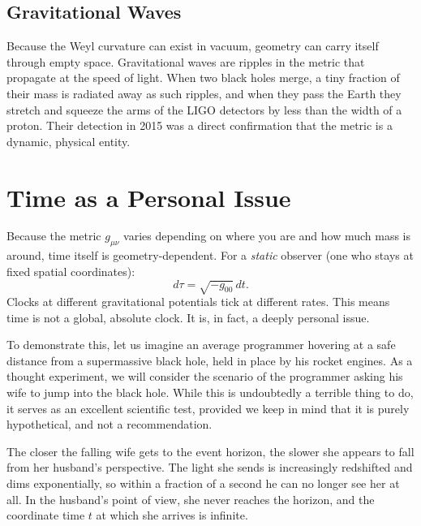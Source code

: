 \subsection*{Gravitational Waves}

Because the Weyl curvature can exist in vacuum, geometry can carry itself through empty space.
Gravitational waves are ripples in the metric that propagate at the speed of light.
When two black holes merge, a tiny fraction of their mass is radiated away as such ripples, and when they pass the Earth 
they stretch and squeeze the arms of the LIGO detectors by less than the width of a proton.
Their detection in 2015 was a direct confirmation that the metric is a dynamic, physical entity.


\section*{Time as a Personal Issue}

Because the metric $g_{\mu\nu}$ varies depending on where you are and how much mass is around, time itself is geometry-dependent.
For a \emph{static} observer (one who stays at fixed spatial coordinates):
\begin{equation}
d\tau = \sqrt{-g_{00}} \, dt.
\end{equation}
Clocks at different gravitational potentials tick at different rates.
This means time is not a global, absolute clock.
It is, in fact, a deeply personal issue.

To demonstrate this, let us imagine an average programmer hovering at a safe distance from a supermassive black hole, held in place by his rocket engines.
As a thought experiment, we will consider the scenario of the programmer asking his wife to jump into the black hole.
While this is undoubtedly a terrible thing to do, it serves as an excellent scientific test, provided we keep in mind that it is purely hypothetical, and not a recommendation.

The closer the falling wife gets to the event horizon, the slower she appears to fall from her husband's perspective.
The light she sends is increasingly redshifted and dims exponentially, so within a fraction of a second he can no longer see her at all.
In the husband's point of view, she never reaches the horizon, and the coordinate time $t$ at which she arrives is infinite.

